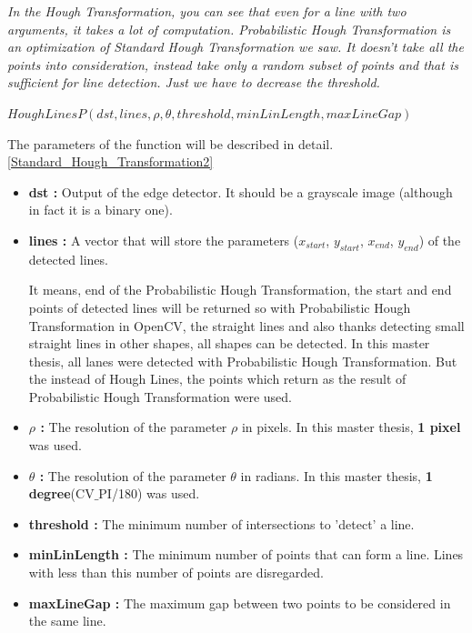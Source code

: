 \emph{\color{red}In the Hough Transformation, you can see that even for a line with two arguments, it takes a lot of computation. Probabilistic Hough Transformation is an optimization of Standard Hough Transformation we saw. It doesn't take all the points into consideration, instead take only a random subset of points and that is sufficient for line detection. Just we have to decrease the threshold.}

  \begin{center}
  
$HoughLinesP(dst, lines, \rho, \theta, threshold, minLinLength, maxLineGap )  $

  \end{center}

The parameters of the function will be described in detail.\ref{Standard_Hough_Transformation2}
 
\begin{itemize}

\item \textbf{dst : }Output of the edge detector. It should be a grayscale image (although in fact it is a binary one).
 
\item \textbf{lines : }A vector that will store the parameters ($ x_{start} $, $ y_{start} $, $ x_{end} $, $ y_{end} $) of the detected lines.

 It means, end of the Probabilistic Hough Transformation, the start and end points of detected lines will be returned so with Probabilistic Hough Transformation in OpenCV, the straight lines and also thanks detecting small straight lines in other shapes, all shapes can be detected. In this master thesis, all lanes were detected with Probabilistic Hough Transformation. But the instead of Hough Lines, the points which return as the result of Probabilistic Hough Transformation were used.

\item \textbf{$ \rho $ : }The resolution of the parameter $ \rho $ in pixels. In this master thesis, \textbf{1 pixel} was used.

\item \textbf{$ \theta $ : }The resolution of the parameter $ \theta $ in radians. In this master thesis, \textbf{1 degree}(CV$ \_ $PI/180) was used.

\item \textbf{threshold : }The minimum number of intersections to 'detect' a line.

\item \textbf{minLinLength : }The minimum number of points that can form a line. Lines with less than this number of points are disregarded.

\item \textbf{maxLineGap : }The maximum gap between two points to be considered in the same line.

\end{itemize}



